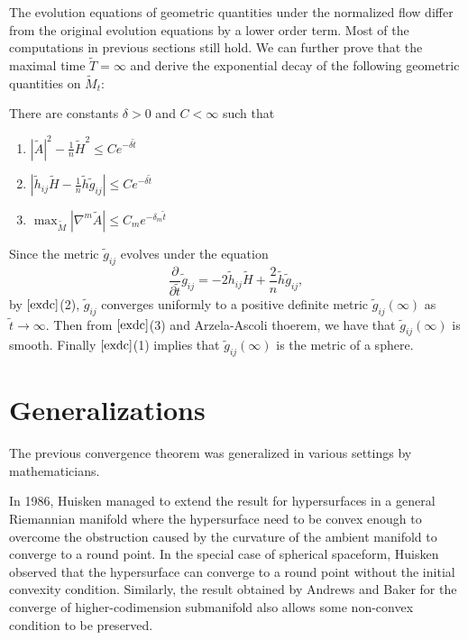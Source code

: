 The evolution equations of geometric quantities under the normalized flow differ from the original evolution equations by a lower order term. Most of the computations in previous sections still hold. We can further prove that the maximal time $\tilde{T}=\infty $ and derive the exponential decay of the following geometric quantities on $\tilde{M}_t$:
\begin{lemma} \label{exdc}
	There are constants $\delta >0$ and $C<\infty $ such that
	\begin{enumerate}
		\item $| \tilde{A} | ^2-\frac{1}{n}\tilde{H}^2 \leq Ce^{-\delta \tilde{t}}$ 
		\item $\left| \tilde{h}_{ij} \tilde{H} - \frac{1}{n}\tilde{h}\tilde{g}_{ij }^{}  \right|\leq Ce^{-\delta \tilde{t}}$ 
		\item $\max_{\tilde{M}}\left| \nabla_{}^{m} \tilde{A} \right| \leq C_m e^{-\delta _m \tilde{t}}$  
	\end{enumerate}
\end{lemma} 
Since the metric $\tilde{g}_{ij }^{} $ evolves under the equation \[\frac{\partial }{\partial \tilde{t}} \tilde{g}_{ij }^{} = -2\tilde{h}_{ij} \tilde{H} +\frac{2}{n}\tilde{h}\tilde{g}_{ij }^{},\]
by $\autoref{exdc}$(2), $\tilde{g}_{ij }^{}$ converges uniformly to a positive definite metric $\tilde{g}_{ij }^{} (\infty )$ as $\tilde{t} \to \infty $. Then from $\autoref{exdc}$(3) and Arzela-Ascoli thoerem, we have that $\tilde{g}_{ij }^{} (\infty )$ is smooth. Finally $\autoref{exdc}$(1) implies that $\tilde{g}_{ij }^{} (\infty )$ is the metric of a sphere.
\section{Generalizations}

The previous convergence theorem was generalized in various settings by mathematicians.

In 1986, Huisken \cite{huisken_contracting_1986} managed to extend the result for hypersurfaces in a general Riemannian manifold where the hypersurface need to be convex enough to overcome the obstruction caused by the curvature of the ambient manifold to converge to a round point. In the special case of spherical spaceform, Huisken \cite{huisken_deforming_1987} observed that the hypersurface can converge to a round point without the initial convexity condition. Similarly, the result obtained by Andrews and Baker \cite{andrews_mean_2010} for the converge of higher-codimension submanifold also allows some non-convex condition to be preserved.

